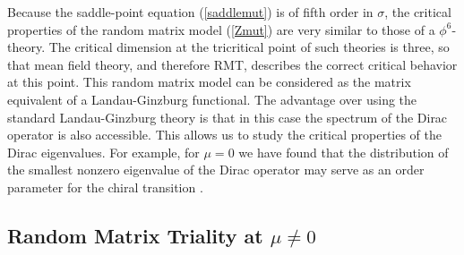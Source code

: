 Because the saddle-point equation (\ref{saddlemut}) is of fifth order
in $\sigma$, the critical properties of the random matrix model
(\ref{Zmut}) are very similar to those of a $\phi^6$-theory.  The
critical dimension at the tricritical point of such theories is three, so
that mean field theory, and therefore RMT, describes
the correct critical behavior at this point.  This random matrix model
can be considered as the matrix equivalent of a Landau-Ginzburg
functional.  The advantage over using the standard Landau-Ginzburg
theory is that in this case the spectrum of the Dirac operator is also
accessible. This allows us to study the critical properties of the
Dirac eigenvalues. For example, for $\mu = 0$ we have found that the
distribution of the smallest nonzero eigenvalue of the Dirac operator
may serve as an order parameter for the chiral transition \cite{JV}.


\subsection{Random Matrix Triality at $\mu \ne 0$}

